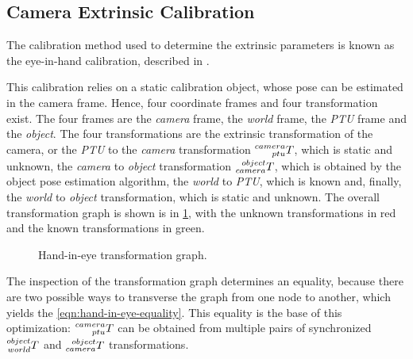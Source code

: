 \subsection{Camera Extrinsic Calibration}
\label{section:camera-extrinsic-calibration}

The calibration method used to determine the extrinsic parameters is known as the eye-in-hand calibration, described in \cite{horaud95}.

This calibration relies on a static calibration object, whose pose can be estimated in the camera frame. Hence, four coordinate frames and four transformation exist. The four frames are the \emph{camera} frame, the \emph{world} frame, the \emph{PTU} frame and the \emph{object}. The four transformations are the extrinsic transformation of the camera, or the \emph{PTU} to the \emph{camera} transformation $\TF{ptu}{camera}$, which is static and unknown, the \emph{camera} to \emph{object} transformation $\TF{camera}{object}$, which is obtained by the object pose estimation algorithm, the \emph{world} to \emph{PTU}, which is known and, finally, the \emph{world} to \emph{object} transformation, which is static and unknown. The overall transformation graph is shown is in \cref{fig:hand-in-eye-tf-graph}, with the unknown transformations in red and the known transformations in green.

\begin{figure}
    
    \centering

    \caption{Hand-in-eye transformation graph.}
    \label{fig:hand-in-eye-tf-graph}

\end{figure}

The inspection of the transformation graph determines an equality, because there are two possible ways to transverse the graph from one node to another, which yields the \cref{eqn:hand-in-eye-equality}. This equality is the base of this optimization: $\TF{ptu}{camera}$ can be obtained from multiple pairs of synchronized $\TF{world}{object}$ and $\TF{camera}{object}$ transformations.

